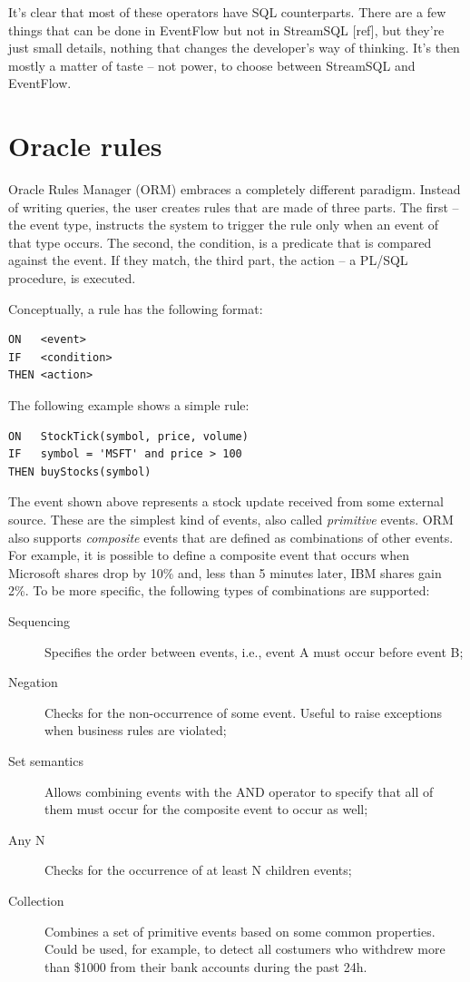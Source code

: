 \documentclass{report}
\begin{document}
It's clear that most of these operators have SQL counterparts. There
are a few things that can be done in EventFlow but not in StreamSQL
[ref], but they're just small details, nothing that changes the
developer's way of thinking. It's then mostly a matter of taste -- not
power, to choose between StreamSQL and EventFlow.

\section{Oracle rules}
\label{sec:orm}

Oracle Rules Manager (ORM) embraces a completely different
paradigm. Instead of writing queries, the user creates rules that are
made of three parts. The first -- the event type, instructs the system
to trigger the rule only when an event of that type occurs. The
second, the condition, is a predicate that is compared against the
event. If they match, the third part, the action -- a PL/SQL
procedure, is executed.

Conceptually, a rule has the following format:

\begin{verbatim}
ON   <event>
IF   <condition>
THEN <action>
\end{verbatim}

The following example shows a simple rule:

\begin{verbatim}
ON   StockTick(symbol, price, volume)
IF   symbol = 'MSFT' and price > 100
THEN buyStocks(symbol)
\end{verbatim}

The event shown above represents a stock update received from some
external source. These are the simplest kind of events, also called
\emph{primitive} events. ORM also supports \emph{composite} events
that are defined as combinations of other events. For example, it is
possible to define a composite event that occurs when Microsoft shares
drop by 10\% and, less than 5 minutes later, IBM shares gain 2\%. To
be more specific, the following types of combinations are supported:
\begin{description}
\item [Sequencing] Specifies the order between events, i.e., event A
  must occur before event B;
\item [Negation] Checks for the non-occurrence of some event. Useful
  to raise exceptions when business rules are violated;
\item [Set semantics] Allows combining events with the AND operator to
  specify that all of them must occur for the composite event to occur
  as well;
\item [Any N] Checks for the occurrence of at least N children events;
\item [Collection] Combines a set of primitive events based on some
  common properties. Could be used, for example, to detect all
  costumers who withdrew more than \$1000 from their bank accounts
  during the past 24h.
\end{description}
\end{document}
